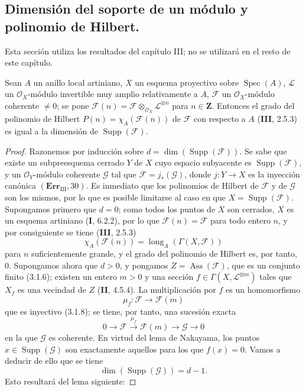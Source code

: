 
\subsection{Dimensión del soporte de un módulo y polinomio de Hilbert.}
\label{IV.2.s5.3-fr}

Esta sección utiliza los resultados del capítulo III; no se utilizará en el
resto de este capítulo.

\begin{proposition}[5.3.1]
\label{IV.2.s5.3.1-fr}
Sean $A$ un anillo local artiniano, $X$ un esquema proyectivo sobre
$\operatorname{Spec}(A)$, $\mathcal L$ un $\mathcal O_X$-módulo invertible
muy amplio relativamente a $A$, $\mathcal F$ un $\mathcal O_X$-módulo
coherente $\ne0$; se pone
$\mathcal F(n)=\mathcal F\otimes_{\mathcal O_X}\mathcal L^{\otimes n}$ para
$n\in\mathbf Z$. Entonces el grado del polinomio de Hilbert
$P(n)=\chi_A(\mathcal F(n))$ de $\mathcal F$ con respecto a $A$ \textup{(\textbf{III}, 2.5.3)}
es igual a la dimensión de $\operatorname{Supp}(\mathcal F)$.
\end{proposition}

\begin{proof}
Razonemos por inducción sobre
$d=\dim(\operatorname{Supp}(\mathcal F))$. Se sabe que existe un
subpreesquema cerrado $Y$ de $X$ cuyo espacio subyacente es
$\operatorname{Supp}(\mathcal F)$, y un $\mathcal O_Y$-módulo coherente
$\mathcal G$ tal que $\mathcal F=j_*(\mathcal G)$, donde $j:Y\to X$ es la
inyección canónica $(\mathbf{Err}_{\mathrm{III}},30)$. Es inmediato que los
polinomios de Hilbert de $\mathcal F$ y de $\mathcal G$ son los mismos, por lo
que es posible limitarse al caso en que
$X=\operatorname{Supp}(\mathcal F)$. Supongamos primero que $d=0$; como todos
los puntos de $X$ son cerrados, $X$ es un esquema artiniano (\textbf I, 6.2.2), por lo
que $\mathcal F(n)=\mathcal F$ para todo entero $n$, y por consiguiente se
tiene (\textbf{III}, 2.5.3)
\[
\chi_A(\mathcal F(n))=\operatorname{long}_A(\Gamma(X,\mathcal F))
\]
para $n$ suficientemente grande, y el grado del polinomio de Hilbert es, por
tanto, $0$. Supongamos ahora que $d>0$, y pongamos
$Z=\operatorname{Ass}(\mathcal F)$, que es un conjunto finito (3.1.6); existen
un entero $m>0$ y una sección
$f\in\Gamma(X,\mathcal L^{\otimes m})$ tales que $X_f$ es una vecindad de
$Z$ (\textbf{II}, 4.5.4). La multiplicación por $f$ es un homomorfismo
\[
\mu_f:\mathcal F\longrightarrow\mathcal F(m)
\]
que es inyectivo (3.1.8); se tiene, por tanto, una sucesión exacta
\begin{equation}
0\longrightarrow\mathcal F\xrightarrow{\mu_f}\mathcal F(m)
\longrightarrow\mathcal G\longrightarrow0
\tag{5.3.1.1}\label{IV.2.s5.3.1.1-fr}
\end{equation}
en la que $\mathcal G$ es coherente. En virtud del lema de Nakayama, los puntos
$x\in\operatorname{Supp}(\mathcal G)$ son exactamente aquellos para los que
$f(x)=0$. Vamos a deducir de ello que se tiene
\begin{equation}
\dim(\operatorname{Supp}(\mathcal G))=d-1.
\tag{5.3.1.2}\label{IV.2.s5.3.1.2-fr}
\end{equation}
Esto resultará del lema siguiente:
\end{proof}

